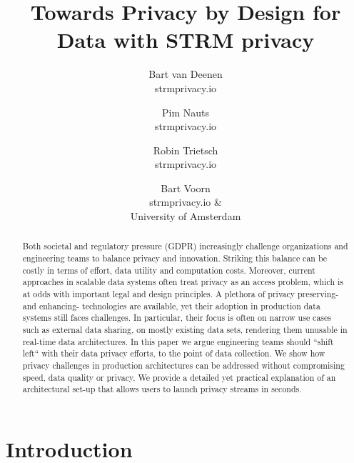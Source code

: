 \documentclass[11pt]{article} %
\begin{document}
\title{Towards Privacy by Design for Data with \MakeUppercase{strm} privacy}

\author{
  Bart van Deenen\\
  \small{strmprivacy.io}
  \and
  Pim Nauts\\
  \small{strmprivacy.io}
  \and
  Robin Trietsch\\
  \small{strmprivacy.io}
  \and
  Bart Voorn\\
  \small{strmprivacy.io \&}\\
  \small{University of Amsterdam}
}
\maketitle




\begin{abstract}
Both societal and regulatory pressure (GDPR) increasingly challenge organizations and engineering teams to balance privacy and innovation. Striking this balance can be costly in terms of effort, data utility and computation costs. Moreover, current approaches in scalable data systems often treat privacy as an access problem, which is at odds with important legal and design principles. A plethora of privacy preserving- and enhancing- technologies are available, yet their adoption in production data systems still faces challenges. In particular, their focus is often on narrow use cases such as external data sharing, on mostly existing data sets, rendering them unusable in real-time data architectures. In this paper we argue engineering teams should ``shift left`` with their data privacy efforts, to the point of data collection. We show how privacy challenges in production architectures can be addressed without compromising speed, data quality or privacy. We provide a detailed yet practical explanation of an architectural set-up that allows users to launch privacy streams in seconds. 
\end{abstract}


\section{Introduction}
\end{document}
